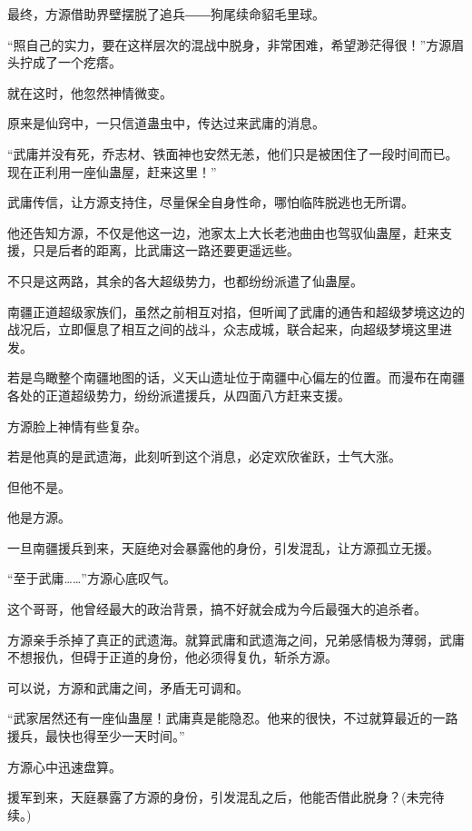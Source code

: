 \begin{this_body}
最终，方源借助界壁摆脱了追兵――狗尾续命貂毛里球。

“照自己的实力，要在这样层次的混战中脱身，非常困难，希望渺茫得很！”方源眉头拧成了一个疙瘩。

就在这时，他忽然神情微变。

原来是仙窍中，一只信道蛊虫中，传达过来武庸的消息。

“武庸并没有死，乔志材、铁面神也安然无恙，他们只是被困住了一段时间而已。现在正利用一座仙蛊屋，赶来这里！”

武庸传信，让方源支持住，尽量保全自身性命，哪怕临阵脱逃也无所谓。

他还告知方源，不仅是他这一边，池家太上大长老池曲由也驾驭仙蛊屋，赶来支援，只是后者的距离，比武庸这一路还要更遥远些。

不只是这两路，其余的各大超级势力，也都纷纷派遣了仙蛊屋。

南疆正道超级家族们，虽然之前相互对掐，但听闻了武庸的通告和超级梦境这边的战况后，立即偃息了相互之间的战斗，众志成城，联合起来，向超级梦境这里进发。

若是鸟瞰整个南疆地图的话，义天山遗址位于南疆中心偏左的位置。而漫布在南疆各处的正道超级势力，纷纷派遣援兵，从四面八方赶来支援。

方源脸上神情有些复杂。

若是他真的是武遗海，此刻听到这个消息，必定欢欣雀跃，士气大涨。

但他不是。

他是方源。

一旦南疆援兵到来，天庭绝对会暴露他的身份，引发混乱，让方源孤立无援。

“至于武庸……”方源心底叹气。

这个哥哥，他曾经最大的政治背景，搞不好就会成为今后最强大的追杀者。

方源亲手杀掉了真正的武遗海。就算武庸和武遗海之间，兄弟感情极为薄弱，武庸不想报仇，但碍于正道的身份，他必须得复仇，斩杀方源。

可以说，方源和武庸之间，矛盾无可调和。

“武家居然还有一座仙蛊屋！武庸真是能隐忍。他来的很快，不过就算最近的一路援兵，最快也得至少一天时间。”

方源心中迅速盘算。

援军到来，天庭暴露了方源的身份，引发混乱之后，他能否借此脱身？(未完待续。)

\end{this_body}

